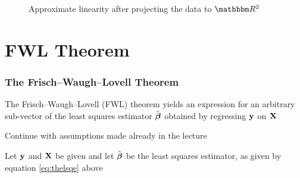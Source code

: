 \begin{frame}

    \begin{figure}
    \centering
    \caption{\label{f:lap3d} Approximate linearity after projecting the data to $\RR^2$}
    
\end{figure}

\end{frame}

\section{FWL Theorem}

\begin{frame}\frametitle{The Frisch--Waugh--Lovell Theorem}

    \vspace{2em}
    The Frisch--Waugh--Lovell (FWL) theorem yields an expression for an arbitrary
    sub-vector of the least squares estimator $\hat {\boldsymbol \beta}$ obtained by regressing
    ${\mathbf y}$ on $\mathbf X$
    
    \vspace{.7em}
    Continue with assumptions made already in the lecture
    
    Let ${\mathbf y}$ and $\mathbf X$ be given and let $\hat {\boldsymbol \beta}$ be the least squares estimator,
    as given by equation \eqref{eq:thelsqe} above
    
\end{frame}

